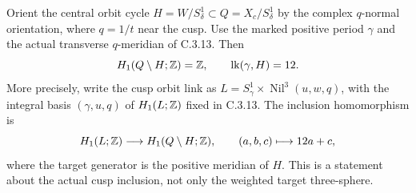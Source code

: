 \begin{proposition}
Orient the central orbit cycle $H=W/S^1_\delta\subset Q=X_c/S^1_\delta$
by the complex $q$-normal orientation, where $q=1/t$ near the cusp.
Use the marked positive period $\gamma$ and the actual transverse
$q$-meridian of C.3.13. Then
\[
 H_1(Q\setminus H;\mathbb Z)=\mathbb Z,
 \qquad \operatorname{lk}(\gamma,H)=12.
\]
More precisely, write the cusp orbit link as
$L=S^1_\gamma\times\operatorname{Nil}^3(u,w,q)$, with the integral
basis $(\gamma,u,q)$ of $H_1(L;\mathbb Z)$ fixed in C.3.13. The inclusion
homomorphism is
\[
 H_1(L;\mathbb Z)\longrightarrow H_1(Q\setminus H;\mathbb Z),
 \qquad (a,b,c)\longmapsto 12a+c,
\]
where the target generator is the positive meridian of $H$.
This is a statement about the actual cusp inclusion, not only the
weighted target three-sphere.
\end{proposition}
